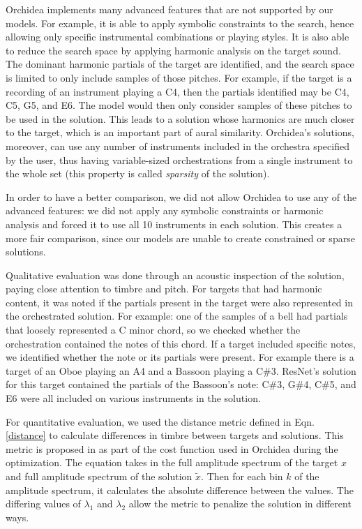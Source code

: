 \documentclass[runningheads,a4paper]{llncs}
\begin{document}
Orchidea implements many advanced features that are not supported by our models. For example, it is able to apply symbolic constraints to the search, hence allowing only specific instrumental combinations or playing styles. It is also able to reduce the search space by applying harmonic analysis on the target sound. The dominant harmonic partials of the target are identified, and the search space is limited to only include samples of those pitches. For example, if the target is a recording of an instrument playing a C4, then the partials identified may be C4, C5, G5, and E6. The model would then only consider samples of these pitches to be used in the solution. This leads to a solution whose harmonics are much closer to the target, which is an important part of aural similarity. Orchidea's solutions, moreover, can use any number of instruments included in the orchestra specified by the user, thus having variable-sized orchestrations from a single instrument to the whole set (this property is called \emph{sparsity} of the solution).

In order to have a better comparison, we did not allow Orchidea to use any of the advanced features: we did not apply any symbolic constraints or harmonic analysis and forced it to use all 10 instruments in each solution. This creates a more fair comparison, since our models are unable to create constrained or sparse solutions.

Qualitative evaluation was done through an acoustic inspection of the solution, paying close attention to timbre and pitch. For targets that had harmonic content, it was noted if the partials present in the target were also represented in the orchestrated solution. For example: one of the samples of a bell had partials that loosely represented a C minor chord, so we checked whether the orchestration contained the notes of this chord. If a target included specific notes, we identified whether the note or its partials were present. For example there is a target of an Oboe playing an A4 and a Bassoon playing a C\#3. ResNet's solution for this target contained the partials of the Bassoon's note: C\#3, G\#4, C\#5, and E6 were all included on various instruments in the solution.

For quantitative evaluation, we used the distance metric defined in Eqn. \ref{distance} to calculate differences in timbre between targets and solutions. This metric is proposed in \cite{Cella2020} as part of the cost function used in Orchidea during the optimization. The equation takes in the full amplitude spectrum of the target $x$ and full amplitude spectrum of the solution $\tilde{x}$. Then for each bin $k$ of the amplitude spectrum, it calculates the absolute difference between the values. The differing values of $\lambda_1$ and $\lambda_2$ allow the metric to penalize the solution in different ways.
\end{document}

